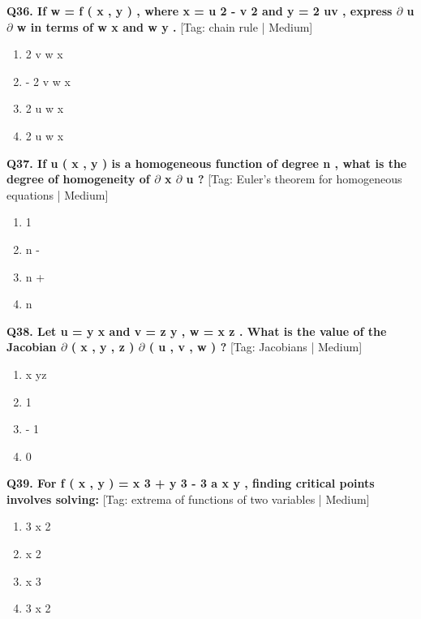 \noindent\textbf{Q36. If w = f ( x , y ) , where x = u 2 - v 2 and y = 2 uv , express $\partial$ u $\partial$ w in terms of w x and w y .} \hfill [Tag: chain rule | Medium]
\begin{enumerate}[label=(\alph*),topsep=2pt,itemsep=1pt,partopsep=0pt,parsep=0pt]
    \item {{2 v w x}}
    \item {{- 2 v w x}}
    \item {{2 u w x}}
    \item {{2 u w x}}
\end{enumerate}
\vspace{2mm}

\noindent\textbf{Q37. If u ( x , y ) is a homogeneous function of degree n , what is the degree of homogeneity of $\partial$ x $\partial$ u ?} \hfill [Tag: Euler's theorem for homogeneous equations | Medium]
\begin{enumerate}[label=(\alph*),topsep=2pt,itemsep=1pt,partopsep=0pt,parsep=0pt]
    \item {{1}}
    \item {{n -}}
    \item {{n +}}
    \item {{n}}
\end{enumerate}
\vspace{2mm}

\noindent\textbf{Q38. Let u = y x and v = z y , w = x z . What is the value of the Jacobian $\partial$ ( x , y , z ) $\partial$ ( u , v , w ) ?} \hfill [Tag: Jacobians | Medium]
\begin{enumerate}[label=(\alph*),topsep=2pt,itemsep=1pt,partopsep=0pt,parsep=0pt]
    \item {{x yz}}
    \item {{1}}
    \item {{- 1}}
    \item {{0}}
\end{enumerate}
\vspace{2mm}

\noindent\textbf{Q39. For f ( x , y ) = x 3 + y 3 - 3 a x y , finding critical points involves solving:} \hfill [Tag: extrema of functions of two variables | Medium]
\begin{enumerate}[label=(\alph*),topsep=2pt,itemsep=1pt,partopsep=0pt,parsep=0pt]
    \item {{3 x 2}}
    \item {{x 2}}
    \item {{x 3}}
    \item {{3 x 2}}
\end{enumerate}
\vspace{2mm}


